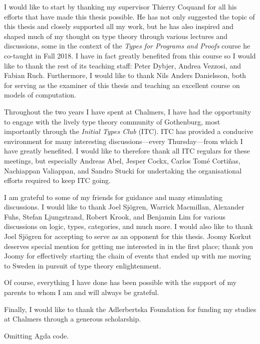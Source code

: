 \begin{acknowledgements}
  I would like to start by thanking my supervisor Thierry Coquand for all his efforts that
  have made this thesis possible. He has not only suggested the topic of this thesis and
  closely supported all my work, but he has also inspired and shaped much of my thought on
  type theory through various lectures and discussions, some in the context of
  the \emph{Types for Programs and Proofs} course he co-taught in Fall 2018. I have in
  fact greatly benefited from this course so I would like to thank the rest of its
  teaching staff: Peter Dybjer, Andrea Vezzosi, and Fabian Ruch. Furthermore, I would like
  to thank Nils Anders Danielsson, both for serving as the examiner of this thesis and
  teaching an excellent course on models of computation.

  Throughout the two years I have spent at Chalmers, I have had the opportunity to engage
  with the lively type theory community of Gothenburg, most importantly through
  the \emph{Initial Types Club} (ITC). ITC has provided a conducive environment for many
  interesting discussions---every Thursday---from which I have greatly benefited. I would like
  to therefore thank all ITC regulars for these meetings, but especially Andreas Abel,
  Jesper Cockx, Carlos Tomé Cortiñas, Nachiappan Valiappan, and Sandro Stucki for
  undertaking the organisational efforts required to keep ITC going.

  I am grateful to some of my friends for guidance and many stimulating discussions. I
  would like to thank Joel Sjögren, Warrick Macmillan, Alexander Fuhs, Stefan
  Ljung\-strand, Robert Krook, and Benjamin Lim for various discussions on logic, types,
  categories, and much more. I would also like to thank Joel Sjögren for accepting to
  serve as an opponent for this thesis. Joomy Korkut deserves special mention for getting
  me interested in \veragda{} in the first place; thank you Joomy for effectively starting
  the chain of events that ended up with me moving to Sweden in pursuit of type theory
  enlightenment.

  Of course, everything I have done has been possible with the support of my parents to
  whom I am and will always be grateful.

  Finally, I would like to thank the Adlerbertska Foundation for funding my studies at
  Chalmers through a generous scholarship.
\end{acknowledgements}

\makelists{}













\makebackmatter{}

\ifdefined\omitagdainappendix
  Omitting Agda code.
\else

\fi


